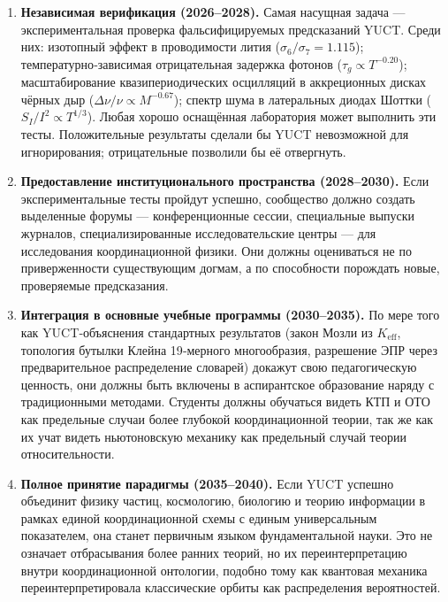 \documentclass[12pt,a4paper]{article}
\begin{document}
	\begin{enumerate}
		\item \textbf{Независимая верификация (2026–2028).} Самая насущная задача — экспериментальная проверка фальсифицируемых предсказаний YUCT. Среди них: изотопный эффект в проводимости лития (\(\sigma_6/\sigma_7 = 1.115\)); температурно‑зависимая отрицательная задержка фотонов (\(\tau_g \propto T^{-0.20}\)); масштабирование квазипериодических осцилляций в аккреционных дисках чёрных дыр (\(\Delta\nu/\nu \propto M^{-0.67}\)); спектр шума в латеральных диодах Шоттки (\(S_I/I^2 \propto T^{1/3}\)). Любая хорошо оснащённая лаборатория может выполнить эти тесты. Положительные результаты сделали бы YUCT невозможной для игнорирования; отрицательные позволили бы её отвергнуть.
		
		\item \textbf{Предоставление институционального пространства (2028–2030).} Если экспериментальные тесты пройдут успешно, сообщество должно создать выделенные форумы — конференционные сессии, специальные выпуски журналов, специализированные исследовательские центры — для исследования координационной физики. Они должны оцениваться не по приверженности существующим догмам, а по способности порождать новые, проверяемые предсказания.
		
		\item \textbf{Интеграция в основные учебные программы (2030–2035).} По мере того как YUCT‑объяснения стандартных результатов (закон Мозли из \(K_{\mathrm{eff}}\), топология бутылки Клейна 19‑мерного многообразия, разрешение ЭПР через предварительное распределение словарей) докажут свою педагогическую ценность, они должны быть включены в аспирантское образование наряду с традиционными методами. Студенты должны обучаться видеть КТП и ОТО как предельные случаи более глубокой координационной теории, так же как их учат видеть ньютоновскую механику как предельный случай теории относительности.
		
		\item \textbf{Полное принятие парадигмы (2035–2040).} Если YUCT успешно объединит физику частиц, космологию, биологию и теорию информации в рамках единой координационной схемы с единым универсальным показателем, она станет первичным языком фундаментальной науки. Это не означает отбрасывания более ранних теорий, но их переинтерпретацию внутри координационной онтологии, подобно тому как квантовая механика переинтерпретировала классические орбиты как распределения вероятностей.
	\end{enumerate}
	
\end{document}
